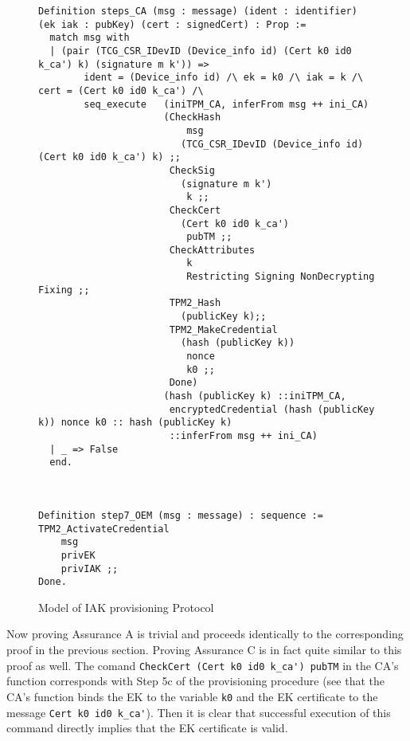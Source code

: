\begin{figure}[h!]
\begin{lstlisting}[language=Coq]
Definition steps_CA (msg : message) (ident : identifier) (ek iak : pubKey) (cert : signedCert) : Prop :=
  match msg with
  | (pair (TCG_CSR_IDevID (Device_info id) (Cert k0 id0 k_ca') k) (signature m k')) =>
        ident = (Device_info id) /\ ek = k0 /\ iak = k /\ cert = (Cert k0 id0 k_ca') /\
        seq_execute   (iniTPM_CA, inferFrom msg ++ ini_CA)
                      (CheckHash 
                          msg 
                         (TCG_CSR_IDevID (Device_info id) (Cert k0 id0 k_ca') k) ;;
                       CheckSig 
                         (signature m k') 
                          k ;;
                       CheckCert 
                         (Cert k0 id0 k_ca') 
                          pubTM ;;
                       CheckAttributes 
                          k 
                          Restricting Signing NonDecrypting Fixing ;;
                       TPM2_Hash 
                         (publicKey k);;
                       TPM2_MakeCredential 
                         (hash (publicKey k))
                          nonce
                          k0 ;;
                       Done)
                      (hash (publicKey k) ::iniTPM_CA, 
                       encryptedCredential (hash (publicKey k)) nonce k0 :: hash (publicKey k) 
                       ::inferFrom msg ++ ini_CA)
  | _ => False
  end.



Definition step7_OEM (msg : message) : sequence :=
TPM2_ActivateCredential 
    msg 
    privEK 
    privIAK ;;
Done.
\end{lstlisting}
\caption{Model of IAK provisioning Protocol}
\label{fig:iak_model}
\end{figure}

Now proving Assurance A is trivial and proceeds identically to the corresponding proof in the previous section.
Proving Assurance C is in fact quite similar to this proof as well. The comand \verb|CheckCert (Cert k0 id0 k_ca') pubTM| in the CA's function corresponds with Step 5c of the provisioning procedure (see that the CA's function binds the EK to the variable \verb|k0| and the EK certificate to the message \verb|Cert k0 id0 k_ca'|). Then it is clear that successful execution of this command directly implies that the EK certificate is valid.

